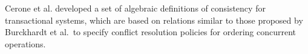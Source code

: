 \documentclass[journal, compsoc]{IEEEtran}
\begin{document}
	Cerone et al. \cite{DBLP:conf/concur/CeroneGY17} developed a set of algebraic definitions of consistency for transactional systems, which are based on relations similar to those proposed by Burckhardt et al.\ to specify conflict resolution policies for ordering concurrent operations.
\end{document}

